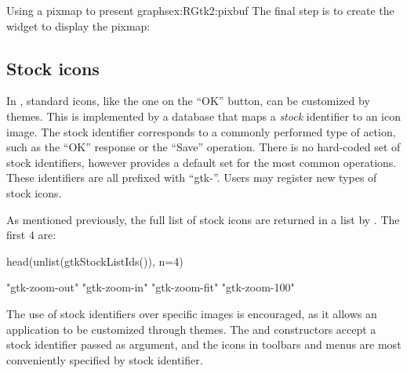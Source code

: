 \begin{example}{Using a pixmap to present graphs}{ex:RGtk2:pixbuf}
The final step is to create the  widget to display the
pixmap: 
\begin{Schunk}
\end{Schunk}

\end{example}


\subsection{Stock icons}
\label{sec:RGtk2:stock-icons}

In \GTK\/, standard icons, like the one on the ``OK'' button, can be
customized by themes. This is implemented by a database that maps a
\textit{stock} identifier to an icon image. The stock identifier
corresponds to a commonly performed type of action, such as the ``OK''
response or the ``Save'' operation. There is no hard-coded set of
stock identifiers, however \GTK\/ provides a default set for the most
common operations. These identifiers are all prefixed with
``gtk-''. Users may register new types of stock icons.

As mentioned previously, the full list of stock icons are returned in
a list by . The first $4$ are:
\begin{Schunk}
\begin{Sinput}
 head(unlist(gtkStockListIds()), n=4)   
\end{Sinput}
\begin{Soutput}
[1] "gtk-zoom-out" "gtk-zoom-in"  "gtk-zoom-fit" "gtk-zoom-100"
\end{Soutput}
\end{Schunk}

The use of stock identifiers over specific images is encouraged, as it
allows an application to be customized through themes. The
 and  constructors accept
a stock identifier passed as  argument, and the icons in
toolbars and menus are most conveniently specified by stock
identifier. 




